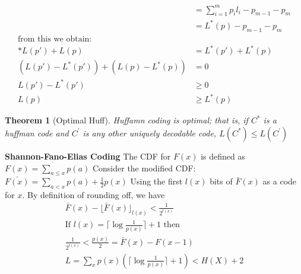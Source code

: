 \documentclass[10pt]{article}
\newtheorem{thm}{Theorem}[section]
\begin{document}
\begin{tiny}
\begin{multicols}{3}
\begin{align*}
&=\sum_{i=1}^{m} {p_i}{l_i} - {p_{m-1}} - {p_{m}}\\
&=L^{*}(p) - {p_{m-1}} - {p_{m}}\\
\text{from this we obtain:}& \\*
L(p') + L(p) &= L^{*}(p') + L^{*}(p)\\
(L(p') -  L^{*}(p')) + (L(p) - L^{*}(p)) &= 0\\
L(p') - L^{*}(p') &\geq 0 \\
L(p) &\geq L^{*}(p)
\end{align*}
\begin{thm}[Optimal Huff] \label{thm: opthuff}
Huffamn coding is optimal; that is, if $C^{*}$ is a huffman code and $C^{'}$ is any other uniquely decodable code,
$L(C^{*}) \leq L(C^{'})$
\end{thm}


\textbf{\scriptsize Shannon-Fano-Elias Coding}
The CDF for ${F(x)}$ is defined as $F(x) = \sum_{a\leq x}p(a)$
Consider the modified CDF: $\bar{ F(x)} = \sum_{a < x}p(a) + \frac{1}{2} p(x)$
Using the first $l(x)$ bits of $\bar{F}(x)$ as a code for $x$. By definition of rounding off, we have 
\begin{eqnarray}
\bar{F}(x) - {\lfloor \bar{F}(x) \rfloor}_{l(x)} < \frac{1}{2^{l(x)}}\\
\text{If } l(x) = \lceil \log \frac{1}{p(x)} \rceil + 1 \text{ then } \\
\frac {1}{2^{l(x)}} < \frac {p(x)}{2} =  \bar{F}(x) - F(x-1)\\
L= \sum_x p(x) (\lceil \log \frac {1}{p(x)} \rceil + 1) < H(X) + 2
\end{eqnarray}


\end{multicols}
\end{tiny}
\end{document}
